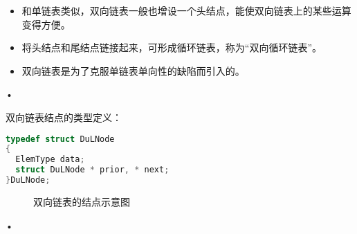 \begin{frame}\ft{\subsecname}
\begin{itemize}
\item 
和单链表类似，双向链表一般也增设一个头结点，能使双向链表上的某些运算变得方便。\\
\item
将头结点和尾结点链接起来，可形成循环链表，称为“双向循环链表”。\\
\item
双向链表是为了克服单链表单向性的缺陷而引入的。\\
\end{itemize}•
\end{frame}
%
\begin{frame}[fragile]\ft{\subsecname}

\textcolor{acolor5}{双向链表结点的类型定义：}
\begin{lstlisting}[language=C,basicstyle=\ttfamily]
typedef struct DuLNode
{
  ElemType data;
  struct DuLNode * prior, * next;
}DuLNode;
\end{lstlisting}

\begin{figure}
\caption{双向链表的结点示意图}
\end{figure}•
\end{frame}
%
%
%
